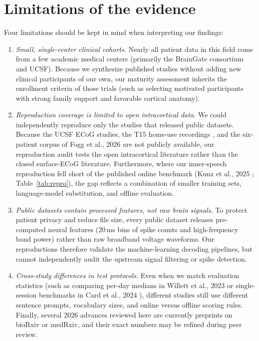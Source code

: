 \documentclass[11pt]{article}
\begin{document}
\section{Limitations of the evidence}
\label{sec:limitations}

Four limitations should be kept in mind when interpreting our findings:
\begin{enumerate}[leftmargin=1.5em,itemsep=2pt]
\item \emph{Small, single-center clinical cohorts.} Nearly all patient
data in this field come from a few academic medical centers (primarily
the BrainGate consortium and UCSF). Because we synthesize published
studies without adding new clinical participants of our own, our
maturity assessment inherits the enrollment criteria of those trials
(such as selecting motivated participants with strong family support and
favorable cortical anatomy).
\item \emph{Reproduction coverage is limited to open intracortical
data.} We could independently reproduce only the studies that released
public datasets. Because the UCSF ECoG studies, the T15 home-use
recordings \cite{card2026}, and the six-patient corpus of Fogg et al.,
2026 \cite{fogg2026} are not publicly available, our reproduction audit
tests the open intracortical literature rather than the closed surface-ECoG
literature. Furthermore, where our inner-speech reproduction fell short
of the published online benchmark (Kunz et al., 2025 \cite{kunz2025};
Table~\ref{tab:repro}), the gap reflects a combination of smaller
training sets, language-model substitution, and offline evaluation.
\item \emph{Public datasets contain processed features, not raw brain
signals.} To protect patient privacy and reduce file size, every public
dataset releases pre-computed neural features (20\,ms bins of spike
counts and high-frequency band power) rather than raw broadband voltage
waveforms. Our reproductions therefore validate the machine-learning
decoding pipelines, but cannot independently audit the upstream signal
filtering or spike detection.
\item \emph{Cross-study differences in test protocols.} Even when we
match evaluation statistics (such as comparing per-day medians in
Willett et al., 2023 \cite{willett2023} or single-session benchmarks in
Card et al., 2024 \cite{card2024}), different studies still use
different sentence prompts, vocabulary sizes, and online versus offline
scoring rules. Finally, several 2026 advances reviewed here are
currently preprints on bioRxiv or medRxiv, and their exact numbers may
be refined during peer review.
\end{enumerate}
\end{document}
